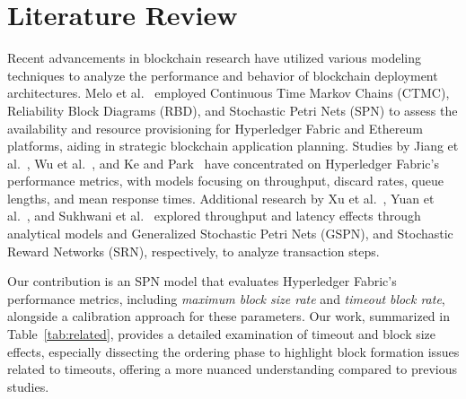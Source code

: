 \section{Literature Review}
\label{sec:rel}

Recent advancements in blockchain research have utilized various modeling techniques to analyze the performance and behavior of blockchain deployment architectures. Melo et al.~\citep{melo_computing2022,melo_supercomp2021} employed Continuous Time Markov Chains (CTMC), Reliability Block Diagrams (RBD), and Stochastic Petri Nets (SPN) to assess the availability and resource provisioning for Hyperledger Fabric and Ethereum platforms, aiding in strategic blockchain application planning. Studies by Jiang et al.~\citep{jiang_springer_p2pna2020}, Wu et al.~\citep{wu_acm_ease2022}, and Ke and Park~\citep{ke_springer_cc2022} have concentrated on Hyperledger Fabric's performance metrics, with models focusing on throughput, discard rates, queue lengths, and mean response times. Additional research by Xu et al.~\citep{xu_ipm2021}, Yuan et al.~\citep{yuan2020performance}, and Sukhwani et al.~\citep{sukhwani2018performance} explored throughput and latency effects through analytical models and Generalized Stochastic Petri Nets (GSPN), and Stochastic Reward Networks (SRN), respectively, to analyze transaction steps.

Our contribution is an SPN model that evaluates Hyperledger Fabric's performance metrics, including \textit{maximum block size rate} and \textit{timeout block rate}, alongside a calibration approach for these parameters. Our work, summarized in Table~\ref{tab:related}, provides a detailed examination of timeout and block size effects, especially dissecting the ordering phase to highlight block formation issues related to timeouts, offering a more nuanced understanding compared to previous studies.

